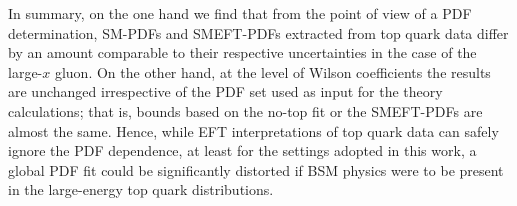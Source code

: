 \documentclass[withindex,glossary]{cam-thesis}
\newcommand{\simunet}{\textsc{SIMUnet}}
\begin{document}
\noindent In summary, on the one hand we find that from the point of view of a PDF determination,
SM-PDFs and SMEFT-PDFs extracted from top quark data differ by an amount comparable
to their respective uncertainties in the case of the large-$x$ gluon.
%
On the other hand, at the level of Wilson coefficients the results are unchanged irrespective
of the PDF set used as input for the theory calculations; that is, bounds based
on the no-top fit or the SMEFT-PDFs are almost the same.
%
Hence, while EFT interpretations of top quark data can safely ignore the PDF dependence,
at least for the settings adopted in this work, a global PDF fit could be significantly
distorted if BSM physics were to be present in the large-energy top quark distributions.


\end{document}
